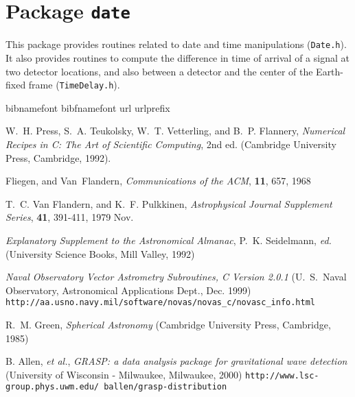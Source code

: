 
\chapter{Package \texttt{date}}

This package provides routines related to date and time manipulations
(\texttt{Date.h}).  It also provides routines to compute the
difference in time of arrival of a signal at two detector locations,
and also between a detector and the center of the Earth-fixed frame
(\texttt{TimeDelay.h}).

\newpage

\newpage

\newpage\begin{thebibliography}{1}
\expandafter\ifx\csname bibnamefont\endcsname\relax
  \def\bibnamefont#1{#1}\fi
\expandafter\ifx\csname bibfnamefont\endcsname\relax
  \def\bibfnamefont#1{#1}\fi
\expandafter\ifx\csname url\endcsname\relax
  \def\url#1{\texttt{#1}}\fi
\expandafter\ifx\csname urlprefix\endcsname\relax\def\urlprefix{URL }\fi
\providecommand{\bibinfo}[2]{#2}
\providecommand{\eprint}[2][]{\url{#2}}

  W.~H. Press, S.~A. Teukolsky, W.~T. Vetterling, and B.~P. Flannery,
  \textit{Numerical Recipes in C: The Art of Scientific Computing}, 2nd ed.
  (Cambridge University Press, Cambridge, 1992).
  
  Fliegen, and Van~Flandern, \textit{Communications of the ACM}, \textbf{11},
  657, 1968 

  T.~C. Van Flandern, and K.~F. Pulkkinen, 
  \textit{Astrophysical Journal Supplement Series}, \textbf{41},
  391-411, 1979 Nov.
  
 \textit{Explanatory Supplement to the Astronomical
  Almanac}, P.~K. Seidelmann, \textit{ed.} (University Science Books,
  Mill Valley, 1992)

  \textit{Naval Observatory Vector Astrometry Subroutines, C Version 2.0.1}
  (U.~S.~Naval Observatory, Astronomical Applications Dept., Dec. 1999)
  \url{http://aa.usno.navy.mil/software/novas/novas_c/novasc_info.html}
  
  R.~M. Green, \textit{Spherical Astronomy} (Cambridge University Press,
  Cambridge, 1985)
  
  B. Allen, \textit{et al.}, \textit{GRASP: a data analysis package
    for gravitational wave detection} (University of Wisconsin
  - Milwaukee, Milwaukee, 2000) 
  \url{http://www.lsc-group.phys.uwm.edu/~ballen/grasp-distribution}
  

\end{thebibliography}
